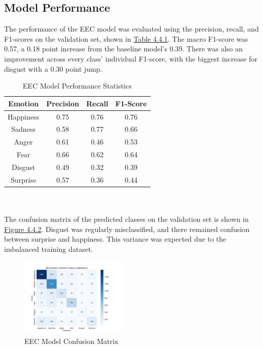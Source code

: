 \documentclass[11pt]{article}
\begin{document}
\subsection{Model Performance}
The performance of the EEC model was evaluated using the precision, recall, and F1-scores on the validation set, shown in  \hyperref[tab:eec_summary_statistics]{Table 4.4.1}. The macro F1-score was 0.57, a 0.18 point increase from the baseline model's 0.39. There was also an improvement across every class' individual F1-score, with the biggest increase for disgust with a 0.30 point jump.
\renewcommand{\thetable}{4.4.1}
\begin{table}[h]
    	\centering
    	\begin{tabular}{c c c c}
        		\toprule
        		\textbf{Emotion} & \textbf{Precision} & \textbf{Recall} & \textbf{F1-Score} \\
        		\midrule
        		Happiness & 0.75 & 0.76 & 0.76 \\
        		Sadness & 0.58 & 0.77 & 0.66 \\
        		Anger & 0.61 & 0.46 & 0.53 \\
        		Fear & 0.66 & 0.62 & 0.64 \\
        		Disgust & 0.49 & 0.32 & 0.39 \\
        		Surprise & 0.57 & 0.36 & 0.44 \\
        		\bottomrule
    	\end{tabular}
    	\caption{EEC Model Performance Statistics}
	\label{tab:eec_summary_statistics}
\end{table}
\\ \\ The confusion matrix of the predicted classes on the validation set is shown in \hyperref[fig:eec_model_confusion_matrix]{Figure 4.4.2}. Disgust was regularly misclassified, and there remained confusion between surprise and happiness. This variance was expected due to the imbalanced training dataset.
\renewcommand{\thefigure}{4.4.2}
\begin{figure}[h]
	\centering
	\includegraphics[width=0.45\textwidth]{validation_nn_emotion_confusion_matrix_combined.png}
	\caption{EEC Model Confusion Matrix}
	\label{fig:eec_model_confusion_matrix}
\end{figure}
\end{document}
